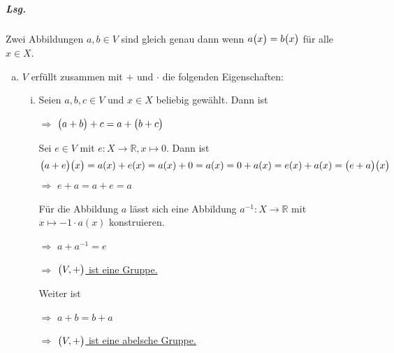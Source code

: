 \documentclass{scrreprt}
\begin{document}
\newpage
\subparagraph{Lsg.} Zwei Abbildungen $a, b \in V$ sind gleich genau dann wenn
$a\qty\big(x) = b\qty\big(x)$ für alle $x \in X$.
\begin{enumerate}[(a)]
\item $V$ erfüllt zusammen mit $+$ und $\cdot$ die folgenden Eigenschaften:
  \begin{enumerate}[(i)]
  \item Seien $a, b, c \in V$ und $x \in X$ beliebig gewählt.
    Dann ist
    $\Rightarrow$ \underline{$\qty\big(a + b) + c = a + \qty\big(b + c)$}

    Sei $e \in V$ mit $e \colon X \to \mathbb{R}, x \mapsto 0$.
    Dann ist
    \[
      \qty\big(a + e)\qty\big(x) = a(x) + e(x) = a(x) + 0 = a(x)
      = 0 + a(x) = e(x) + a(x) = \qty\big(e + a)\qty\big(x)
    \]
    $\Rightarrow$ \underline{$e + a = a + e = a$}

    Für die Abbildung $a$ lässt sich eine Abbildung
    $a^{-1} \colon X \to \mathbb{R}$ mit $x \mapsto -1 \cdot a(x)$
    konstruieren.
    $\Rightarrow$ \underline{$a + a^{-1} = e$}

    $\Rightarrow$ \underline{$\qty\big(V, +)$ ist eine Gruppe.}

    Weiter ist
    $\Rightarrow$ \underline{$a + b = b + a$}

    $\Rightarrow$ \underline{$\qty\big(V, +)$ ist eine abelsche Gruppe.}


\end{enumerate}
\end{enumerate}
\end{document}
